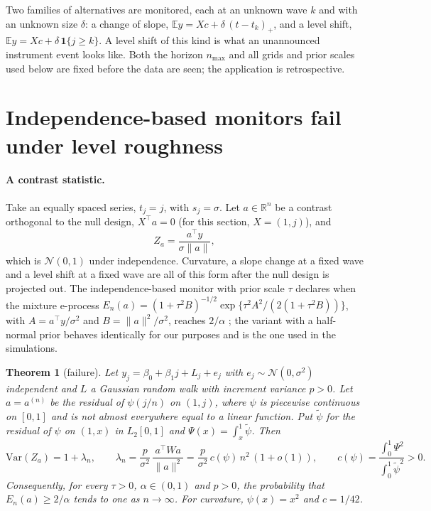 \documentclass[11pt]{article}
\theoremstyle{plain}
\newtheorem{theorem}{Theorem}
\theoremstyle{definition}
\newcommand{\E}{\mathbb{E}}
\begin{document}
Two families of alternatives are monitored, each at an unknown wave $k$ and with an unknown size $\delta$: a change of slope, $\E y = Xc + \delta\,(t - t_k)_+$, and a level shift, $\E y = Xc + \delta\,\mathbf{1}\{j \ge k\}$. A level shift of this kind is what an unannounced instrument event looks like. Both the horizon $n_{\max}$ and all grids and prior scales used below are fixed before the data are seen; the application is retrospective.

\section{Independence-based monitors fail under level roughness}
\label{sec:failure}

\paragraph{A contrast statistic.} Take an equally spaced series, $t_j = j$, with $s_j = \sigma$. Let $a \in \mathbb{R}^n$ be a contrast orthogonal to the null design, $X^\top a = 0$ (for this section, $X = (1, j)$), and
\[
Z_a = \frac{a^\top y}{\sigma\|a\|},
\]
which is $\mathcal{N}(0,1)$ under independence. Curvature, a slope change at a fixed wave and a level shift at a fixed wave are all of this form after the null design is projected out. The independence-based monitor with prior scale $\tau$ declares when the mixture e-process $E_n(a) = (1+\tau^2 B)^{-1/2}\exp\{\tau^2 A^2/(2(1+\tau^2 B))\}$, with $A = a^\top y/\sigma^2$ and $B = \|a\|^2/\sigma^2$, reaches $2/\alpha$ \citep{robbins1970}; the variant with a half-normal prior behaves identically for our purposes and is the one used in the simulations.

\begin{theorem}[failure]
\label{thm:failure}
Let $y_j = \beta_0 + \beta_1 j + L_j + e_j$ with $e_j \sim \mathcal{N}(0,\sigma^2)$ independent and $L$ a Gaussian random walk with increment variance $p>0$. Let $a = a^{(n)}$ be the residual of $\psi(j/n)$ on $(1,j)$, where $\psi$ is piecewise continuous on $[0,1]$ and is not almost everywhere equal to a linear function. Put $\tilde\psi$ for the residual of $\psi$ on $(1,x)$ in $L_2[0,1]$ and $\Psi(x) = \int_x^1 \tilde\psi$. Then
\[
\mathrm{Var}(Z_a) = 1 + \lambda_n,\qquad \lambda_n = \frac{p}{\sigma^2}\,\frac{a^\top W a}{\|a\|^2} = \frac{p}{\sigma^2}\,c(\psi)\,n^2\,(1 + o(1)),\qquad c(\psi) = \frac{\int_0^1 \Psi^2}{\int_0^1\tilde\psi^2} > 0 .
\]
Consequently, for every $\tau>0$, $\alpha\in(0,1)$ and $p>0$, the probability that $E_n(a)\ge 2/\alpha$ tends to one as $n\to\infty$. For curvature, $\psi(x) = x^2$ and $c = 1/42$.
\end{theorem}
\end{document}
